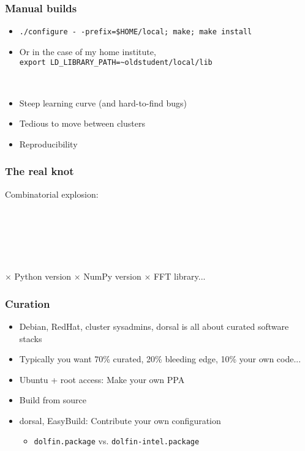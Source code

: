 \documentclass[sans,mathserif]{beamer}
\begin{document}
\begin{frame}
  \frametitle{Manual builds}

  \begin{itemize}
  \item<+-> {\tt ./configure -\,{}-prefix=\$HOME/local; make; make install}
  \item<+->{Or in the case of my home institute,\\
{\tt export LD\_LIBRARY\_PATH=\textasciitilde{}oldstudent/local/lib}}
  \end{itemize}

~


\begin{itemize}
\item<+-> Steep learning curve (and hard-to-find bugs)
\item<+-> Tedious to move between clusters
\item<+-> Reproducibility 
\end{itemize}
\end{frame}

\begin{frame}
  \frametitle{The real knot}

Combinatorial explosion:

~

~


~

$\times$ Python version $\times$ NumPy version $\times$ FFT library...

\end{frame}


\begin{frame}
  \frametitle{Curation}
  
  \begin{itemize}
  \item<+-> Debian, RedHat, cluster sysadmins, dorsal is all about curated software stacks
  \item<+-> Typically you want 70\% curated, 20\% bleeding edge, 10\% your own code...
  \item<+-> Ubuntu + root access: Make your own PPA
  \item<+-> Build from source
  \item<+-> dorsal, EasyBuild: Contribute your own configuration
    \begin{itemize}
    \item {\tt dolfin.package} vs. {\tt dolfin-intel.package}
    \end{itemize}
  \end{itemize}
\end{frame}
\end{document}
